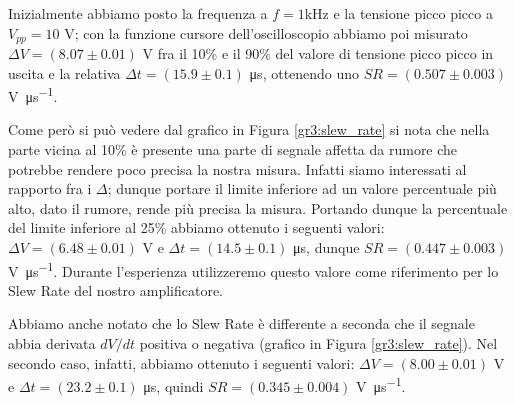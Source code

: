 Inizialmente abbiamo posto la frequenza a $f=1$\si{\kilo\hertz} e la tensione picco picco a $V_{pp}=10$ \si{\volt}; con la funzione cursore dell'oscilloscopio abbiamo poi misurato $\Delta V = (8.07 \pm 0.01)$ \si{\volt} fra il 10\% e il 90\% del valore di tensione picco picco in uscita e la relativa $\Delta t = (15.9 \pm 0.1)$ \si{\micro\second}, ottenendo uno $SR=(0.507 \pm 0.003)$ \si{\volt\per\micro\second}.

Come però si può vedere dal grafico in Figura \ref{gr3:slew_rate} si nota che nella parte vicina al 10\% è presente una parte di segnale affetta da rumore che potrebbe rendere poco precisa la nostra misura. Infatti siamo interessati al rapporto fra i $\Delta$; dunque portare il limite inferiore ad un valore percentuale più alto, dato il rumore, rende più precisa la misura. Portando dunque la percentuale del limite inferiore al 25\% abbiamo ottenuto i seguenti valori: $\Delta V = (6.48 \pm 0.01)$ \si{\volt} e $\Delta t = (14.5 \pm 0.1)$ \si{\micro\second}, dunque $SR = (0.447 \pm 0.003)$ \si{\volt\per\micro\second}. Durante l'esperienza utilizzeremo questo valore come riferimento per lo Slew Rate del nostro amplificatore.

Abbiamo anche notato che lo Slew Rate è differente a seconda che il segnale abbia derivata $dV/dt$ positiva o negativa (grafico in Figura \ref{gr3:slew_rate}). Nel secondo caso, infatti, abbiamo ottenuto i seguenti valori: $\Delta V = (8.00 \pm 0.01)$ \si{\volt} e $\Delta t = (23.2 \pm 0.1)$ \si{\micro\second}, quindi $SR = (0.345 \pm 0.004)$ \si{\volt\per\micro\second}.

